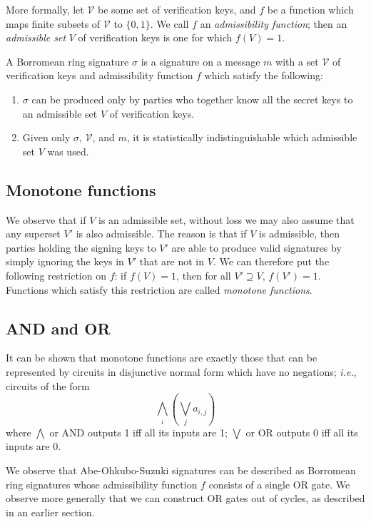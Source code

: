 \documentclass[letterpaper]{article}
\begin{document}
More formally,
let $\mathcal{V}$ be some set of verification keys, and $f$ be a function which
maps finite subsets of $\mathcal{V}$ to $\{0,1\}$. We call $f$ an \emph{admissibility
function}; then an \emph{admissible set} $V$ of verification keys is one for which
$f(V) = 1$.

A Borromean ring signature $\sigma$ is a signature on a message $m$ with a set
$\mathcal{V}$ of verification keys and admissibility function $f$ which
satisfy the following:
\begin{enumerate}
\item $\sigma$ can be produced only by parties who together know all the secret
keys to an admissible set $V$ of verification keys.
\item Given only $\sigma$, $\mathcal{V}$, and $m$, it is statistically
indistinguishable which admissible set $V$ was used.
\end{enumerate}

\subsection{Monotone functions}

We observe that if $V$ is an admissible set, without loss we may also assume
that any superset $V'$ is also admissible. The reason is that if $V$ is
admissible, then parties holding the signing keys to $V'$ are able to produce
valid signatures by simply ignoring the keys in $V'$ that are not in $V$.
We can therefore put the following restriction on $f$: if $f(V) = 1$, then
for all $V'\supseteq V$, $f(V') = 1$. Functions which satisfy this restriction
are called \emph{monotone functions}.

\subsection{AND and OR}

It can be shown\cite{benaloh+leichter1988} that monotone functions are exactly
those that can be represented by circuits in disjunctive normal form which have
no negations; \emph{i.e.}, circuits of the form
\[ \bigwedge_i \left(\bigvee_j a_{i,j}\right) \]
where $\bigwedge$ or AND outputs 1 iff all its inputs are 1; $\bigvee$ or OR
outputs 0 iff all its inputs are 0.

We observe that Abe-Ohkubo-Suzuki signatures can be described as Borromean ring signatures
whose admissibility function $f$ consists of a single OR gate. We observe more
generally that we can construct OR gates out of cycles, as described in an
earlier section.
\end{document}
